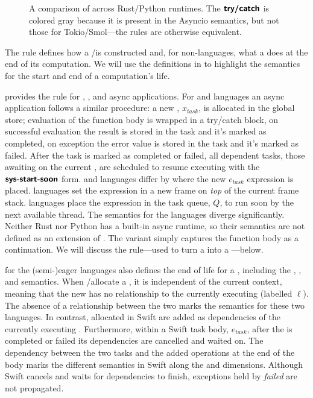 \begin{figure}[tb]
    
    \cprotect\caption{A comparison of  across Rust/Python runtimes. The $\text{\normalfont\textsf{\textbf{try/catch}}}$ is colored gray because it is present in the Asyncio semantics, but not those for Tokio/Smol---the rules are otherwise equivalent.}
    \label{fig:sem:spawn}
\end{figure}

The rule  defines how a \coro/\task is constructed and, for non-\lazy languages, what a \task does at the end of its computation. We will use the definitions in  to highlight the semantics for the start and end of a computation's life.

 provides the  rule for \eager, \seager, and \lazy async applications. For \eager and \seager languages an async application follows a similar procedure: a new \task, $x_{\mathit{task}}$, is allocated in the global store; evaluation of the function body is wrapped in a try/catch block, on successful evaluation the result is stored in the task and it's marked as completed, on exception the error value is stored in the task and it's marked as failed. After the task is marked as completed or failed, all dependent tasks, those awaiting on the current \task, are scheduled to resume executing with the $\text{\normalfont\textsf{\textbf{sys-start-soon}}}$ form. \Eager and \seager languages differ by where the new $e_{\mathit{task}}$ expression is placed. \Eager languages set the expression in a new frame on \emph{top} of the current frame stack. \Seager languages place the expression in the task queue, $Q$, to run soon by the next available thread. The semantics for the \lazy languages diverge significantly. Neither Rust nor Python has a built-in async runtime, so their semantics are not defined as an extension of \lasync. The \lazy {} variant simply captures the function body as a continuation. We will discuss the  rule---used to turn a \coro into a \task{}---below.

 for the (semi-)eager languages also defines the end of life for a \task, including the \extent, \destruction, and \propagation semantics. When \CSharp/\Js allocate a \task, it is independent of the current context, meaning that the new \task has no relationship to the currently executing \task (labelled $\ell$). The absence of a relationship between the two \tasks marks the \indef \extent semantics for these two languages. In contrast, allocated \tasks in Swift are added as dependencies of the currently executing \task. Furthermore, within a Swift task body, $e_{\mathit{task}}$, after the \task is completed or failed its dependencies are cancelled and waited on. The dependency between the two tasks and the added operations at the end of the \task body marks the different semantics in Swift along the \extent and \destruction dimensions. Although Swift cancels and waits for dependencies to finish, exceptions held by \emph{failed} \tasks are not propagated.

